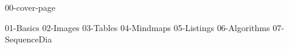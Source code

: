 \documentclass[a4paper,12pt]{article}
\begin{document}
\ifdefined\dochdr
    \pagestyle{fancy}
    \fancyhead[RL]{}
    \fancyhead[C]{\dochdr}
\fi

{00-cover-page}

\ifdefined\doctoc
    \tableofcontents
    \clearpage
\fi

\ifdefined\doclof
    \listoffigures
    \clearpage
\fi


{01-Basics}
{02-Images}
{03-Tables}
{04-Mindmaps}
{05-Listings}
{06-Algorithms}
{07-SequenceDia}
\end{document}

